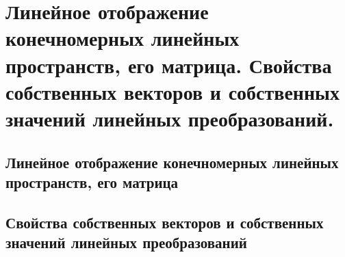 \chapter{Линейное отображение конечномерных линейных пространств, его матрица. Свойства собственных векторов и собственных значений линейных преобразований.}
\section{Линейное отображение конечномерных линейных пространств, его матрица}
\section{Свойства собственных векторов и собственных значений линейных преобразований}